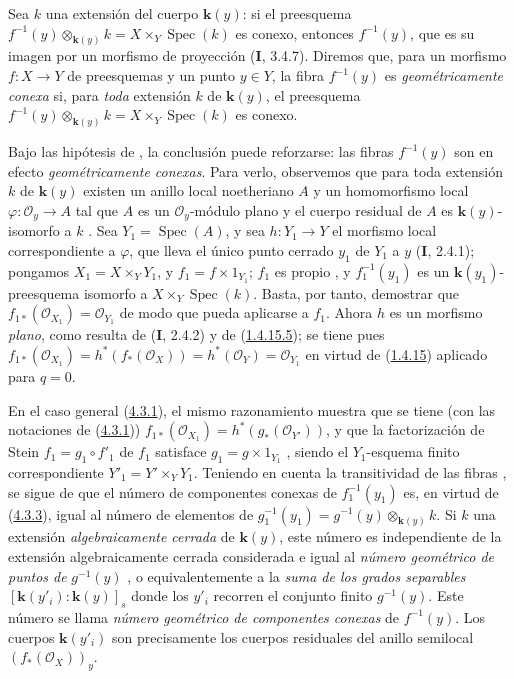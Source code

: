 \begin{remark}[4.3.4]
\label{III.4.3.4}
\label{III.4.3.4-fr}
Sea $k$ una extensión del cuerpo $\boldsymbol{k}(y)$: si el preesquema $f^{-1}(y)\otimes_{\boldsymbol{k}(y)}k=X\times_Y\operatorname{Spec}(k)$
es conexo, entonces $f^{-1}(y)$, que es su imagen por un morfismo de proyección (\textbf{I}, 3.4.7). Diremos que, para un morfismo $f:X\to Y$ de preesquemas y un punto
$y\in Y$, la fibra $f^{-1}(y)$ es
\emph{geométricamente conexa} si, para \emph{toda} extensión $k$ de
$\boldsymbol{k}(y)$, el preesquema
$f^{-1}(y)\otimes_{\boldsymbol{k}(y)}k=X\times_Y\operatorname{Spec}(k)$ es conexo.


Bajo las hipótesis de , la conclusión puede
reforzarse: las fibras $f^{-1}(y)$ son en efecto \emph{geométricamente conexas}. Para verlo, observemos que para toda extensión $k$ de $\boldsymbol{k}(y)$ existen un anillo
local noetheriano $A$ y un homomorfismo local
$\varphi:\mathcal O_y\to A$
tal que $A$ es un $\mathcal O_y$-módulo plano y el cuerpo residual de
$A$ es $\boldsymbol{k}(y)$-isomorfo a $k$ .
Sea $Y_1=\operatorname{Spec}(A)$, y sea $h:Y_1\to Y$ el morfismo local
correspondiente a $\varphi$, que lleva el único punto cerrado $y_1$ de
$Y_1$ a $y$ (\textbf{I}, 2.4.1); pongamos
$X_1=X\times_YY_1$, y $f_1=f\times1_{Y_1}$; $f_1$ es propio
, y $f_1^{-1}(y_1)$ es un
$\boldsymbol{k}(y_1)$-preesquema isomorfo a $X\times_Y\operatorname{Spec}(k)$. Basta, por
tanto, demostrar que
$f_{1*}(\mathcal O_{X_1})=\mathcal O_{Y_1}$
de modo que  pueda aplicarse a $f_1$. Ahora $h$ es un morfismo \emph{plano},
como resulta de (\textbf{I}, 2.4.2) y de
(\hyperref[III.1.4.15-fr]{1.4.15.5}); se tiene pues
$f_{1*}(\mathcal O_{X_1})
=h^*(f_*(\mathcal O_X))
=h^*(\mathcal O_Y)
=\mathcal O_{Y_1}$
en virtud de (\hyperref[III.1.4.15-fr]{1.4.15}) aplicado para $q=0$.

En el caso general (\hyperref[III.4.3.1-fr]{4.3.1}), el mismo razonamiento
muestra que se tiene (con las notaciones de
(\hyperref[III.4.3.1-fr]{4.3.1}))
$f_{1*}(\mathcal O_{X_1})=h^*(g_*(\mathcal O_{Y'}))$,
y que la factorización de Stein $f_1=g_1\circ f'_1$ de $f_1$
satisface
$g_1=g\times1_{Y_1}$
, siendo el $Y_1$-esquema finito correspondiente
$Y'_1=Y'\times_YY_1$. Teniendo en cuenta la transitividad de las
fibras , se sigue de
 que el número de componentes conexas de
$f_1^{-1}(y_1)$ es, en virtud de (\hyperref[III.4.3.3-fr]{4.3.3}), igual al número de elementos de $g_1^{-1}(y_1)=g^{-1}(y)\otimes_{\boldsymbol{k}(y)}k$.
Si $k$ una extensión \emph{algebraicamente cerrada} de $\boldsymbol{k}(y)$, este número
es independiente de la extensión algebraicamente cerrada considerada e igual al
\emph{número geométrico de puntos de} $g^{-1}(y)$
, o equivalentemente a la
\emph{suma de los grados separables}
$[\boldsymbol{k}(y'_i):\boldsymbol{k}(y)]_s$
donde los $y'_i$ recorren el conjunto finito $g^{-1}(y)$. Este número
se llama \emph{número geométrico de componentes conexas} de
$f^{-1}(y)$. Los cuerpos $\boldsymbol{k}(y'_i)$ son precisamente los cuerpos
residuales del anillo semilocal $(f_*(\mathcal O_X))_y$.
\end{remark}

